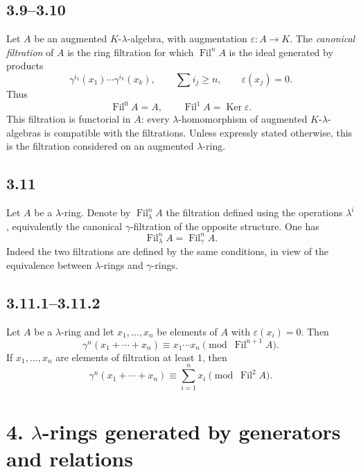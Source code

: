 \documentclass[13pt]{extarticle}
\newcommand{\Fil}{\operatorname{Fil}}
\newcommand{\Ker}{\operatorname{Ker}}
\begin{document}
\subsection*{3.9--3.10}
Let $A$ be an augmented $K$-$\lambda$-algebra, with augmentation $\varepsilon:A\to K$. The \emph{canonical filtration} of $A$ is the ring filtration for which $\Fil^nA$ is the ideal generated by products
\begin{equation}\label{eq:3.10}
\gamma^{i_1}(x_1)\cdots\gamma^{i_k}(x_k),
\qquad
\sum i_j\geq n,
\qquad
\varepsilon(x_j)=0.
\end{equation}
Thus
\begin{equation}\label{eq:3.10.1}
\Fil^0A=A,
\qquad
\Fil^1A=\Ker\varepsilon.
\end{equation}
This filtration is functorial in $A$: every $\lambda$-homomorphism of augmented $K$-$\lambda$-algebras is compatible with the filtrations. Unless expressly stated otherwise, this is the filtration considered on an augmented $\lambda$-ring.

\subsection*{3.11}
Let $A$ be a $\lambda$-ring. Denote by $\Fil^n_\lambda A$ the filtration defined using the operations $\lambda^i$, equivalently the canonical $\gamma$-filtration of the opposite structure. One has
\begin{equation}\label{eq:3.11}
\Fil^n_\lambda A=\Fil^n_\gamma A.
\end{equation}
Indeed the two filtrations are defined by the same conditions, in view of the equivalence between $\lambda$-rings and $\gamma$-rings.

\subsection*{3.11.1--3.11.2}
Let $A$ be a $\lambda$-ring and let $x_1,\ldots,x_n$ be elements of $A$ with $\varepsilon(x_i)=0$. Then
\begin{equation}\label{eq:3.11.1}
\gamma^n(x_1+\cdots+x_n)\equiv x_1\cdots x_n\pmod{\Fil^{n+1}A}.
\end{equation}
If $x_1,\ldots,x_n$ are elements of filtration at least $1$, then
\begin{equation}\label{eq:3.11.2}
\gamma^n(x_1+\cdots+x_n)\equiv \sum_{i=1}^{n}x_i\pmod{\Fil^2A}.
\end{equation}

\section*{4. $\lambda$-rings generated by generators and relations}
\end{document}
